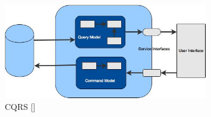 \begin{figure}[H]
\begin{center}
\includegraphics[width=0.8\textwidth]{figures/Appendices_one_cqrs}
\caption{CQRS [\cite{Fowler:2011ab}]}
\label{fig:appendices/cqrs}
\end{center}
\end{figure}